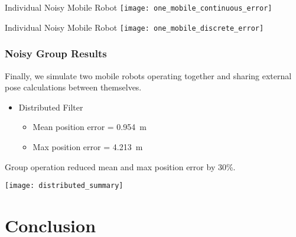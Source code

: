 \documentclass[14pt]{beamer}
\begin{document}
\begin{frame}{Individual Noisy Mobile Robot}
\texttt{[image: one\_mobile\_continuous\_error]}
\end{frame}

\begin{frame}{Individual Noisy Mobile Robot}
\texttt{[image: one\_mobile\_discrete\_error]}
\end{frame}

\begin{frame}
\frametitle{Noisy Group Results}
Finally, we simulate two mobile robots operating together and sharing external pose calculations between themselves.

\vspace{14pt}
\pause
\begin{itemize}
\item Distributed Filter
    \begin{itemize}
    \item Mean position error = \SI{.954}{\meter}
    \item Max position error = \SI{4.213}{\meter}
    \end{itemize}
\end{itemize}

\pause
\vspace{14pt}
Group operation reduced mean and max position error by 30\%.
\end{frame}

\begin{frame} %
\texttt{[image: distributed\_summary]}
\end{frame}

\section{Conclusion}
\end{document}
